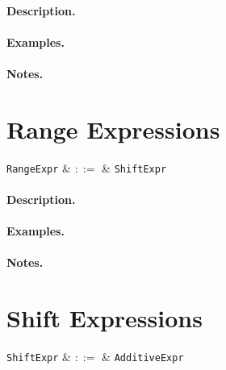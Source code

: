 \paragraph{Description.}

\paragraph{Examples.}

\paragraph{Notes.} 



\section{Range Expressions}
\label{c_expr_range}

\begin{syntax}
  \verb+RangeExpr+ & $::=$ & \verb+ShiftExpr+\ \\
\end{syntax}

\paragraph{Description.}

\paragraph{Examples.}

\paragraph{Notes.} 


\section{Shift Expressions}
\label{c_expr_shift}

\begin{syntax}
  \verb+ShiftExpr+ & $::=$ & \verb+AdditiveExpr+\ 
\end{syntax}

